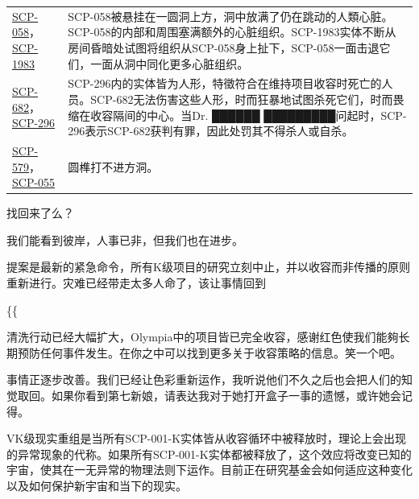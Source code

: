 \begin{longtable}{m{}m{}}
\hyperref[chap:SCP-058]{SCP-058}，\hyperref[chap:SCP-1983]{SCP-1983} & SCP-058被悬挂在一圆洞上方，洞中放满了仍在跳动的人類心脏。SCP-058的内部和周围塞满额外的心脏组织。SCP-1983实体不断从房间昏暗处试图将组织从SCP-058身上扯下，SCP-058一面击退它们，一面从洞中同化更多心脏组织。 \\
\hyperref[chap:SCP-682]{SCP-682}，\hyperref[chap:SCP-296]{SCP-296} & SCP-296内的实体皆为人形，特徵符合在维持项目收容时死亡的人员。SCP-682无法伤害这些人形，时而狂暴地试图杀死它们，时而畏缩在收容隔间的中心。当Dr. ██████ █████████问起时，SCP-296表示SCP-682获判有罪，因此处罚其不得杀人或自杀。 \\
\hyperref[chap:SCP-579]{SCP-579}，\hyperref[chap:SCP-055]{SCP-055} & 圆榫打不进方洞。
\end{longtable}




\begin{scpbox}

找回来了么？

我们能看到彼岸，人事已非，但我们也在进步。

提案是最新的紧急命令，所有K级项目的研究立刻中止，并以收容而非传播的原则重新进行。灾难已经带走太多人命了，该让事情回到

\{\{

清洗行动已经大幅扩大，Olympia中的项目皆已完全收容，感谢红色使我们能夠长期预防任何事件发生。在你之中可以找到更多关于收容策略的信息。笑一个吧。

事情正逐步改善。我们已经让色彩重新运作，我听说他们不久之后也会把人们的知觉取回。如果你看到第七新娘，请表达我对于她打开盒子一事的遗憾，或许她会记得。

\end{scpbox}

VK级现实重组是当所有SCP-001-K实体皆从收容循环中被释放时，理论上会出现的异常现象的代称。如果所有SCP-001-K实体都被释放了，这个效应将改变已知的宇宙，使其在一无异常的物理法则下运作。目前正在研究基金会如何适应这种变化以及如何保护新宇宙和当下的现实。